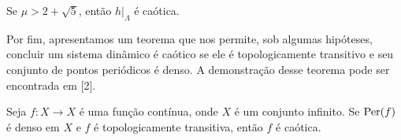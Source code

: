 \begin{theorem}
Se $\mu > 2 + \sqrt{5}$, então $h|_\Lambda$ é caótica.
\end{theorem}

Por fim, apresentamos um teorema que nos permite, sob algumas hipóteses, concluir um sistema dinâmico é caótico se ele é topologicamente transitivo e seu conjunto de pontos periódicos é denso. A demonstração desse teorema pode ser encontrada em [2].

\begin{theorem}
Seja $f: X \to X$ é uma função contínua, onde $X$ é um conjunto infinito. Se $\operatorname{Per}(f)$ é denso em $X$ e $f$ é topologicamente transitiva, então $f$ é caótica.
\end{theorem}
